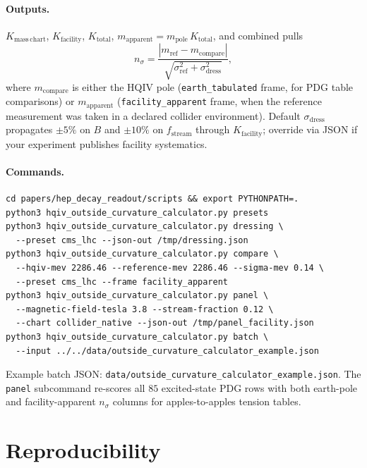 \documentclass[11pt]{amsart}
\begin{document}
\paragraph{Outputs.}
$K_{\mathrm{mass\,chart}}$, $K_{\mathrm{facility}}$, $K_{\mathrm{total}}$,
$m_{\mathrm{apparent}}=m_{\mathrm{pole}}\,K_{\mathrm{total}}$, and combined pulls
\begin{equation}
  n_\sigma=
  \frac{|m_{\mathrm{ref}}-m_{\mathrm{compare}}|}
  {\sqrt{\sigma_{\mathrm{ref}}^2+\sigma_{\mathrm{dress}}^2}},
\end{equation}
where $m_{\mathrm{compare}}$ is either the HQIV pole (\texttt{earth\_tabulated} frame,
for PDG table comparisons) or $m_{\mathrm{apparent}}$ (\texttt{facility\_apparent} frame,
when the reference measurement was taken in a declared collider environment).
Default $\sigma_{\mathrm{dress}}$ propagates $\pm 5\%$ on $B$ and $\pm 10\%$ on
$f_{\mathrm{stream}}$ through $K_{\mathrm{facility}}$; override via JSON if your
experiment publishes facility systematics.

\paragraph{Commands.}
\begin{verbatim}
cd papers/hep_decay_readout/scripts && export PYTHONPATH=.
python3 hqiv_outside_curvature_calculator.py presets
python3 hqiv_outside_curvature_calculator.py dressing \
  --preset cms_lhc --json-out /tmp/dressing.json
python3 hqiv_outside_curvature_calculator.py compare \
  --hqiv-mev 2286.46 --reference-mev 2286.46 --sigma-mev 0.14 \
  --preset cms_lhc --frame facility_apparent
python3 hqiv_outside_curvature_calculator.py panel \
  --magnetic-field-tesla 3.8 --stream-fraction 0.12 \
  --chart collider_native --json-out /tmp/panel_facility.json
python3 hqiv_outside_curvature_calculator.py batch \
  --input ../../data/outside_curvature_calculator_example.json
\end{verbatim}
Example batch JSON: \texttt{data/outside\_curvature\_calculator\_example.json}.
The \texttt{panel} subcommand re-scores all $85$ excited-state PDG rows with both
earth-pole and facility-apparent $n_\sigma$ columns for apples-to-apples tension tables.

\section{Reproducibility}
\label{app:repro}
\end{document}
